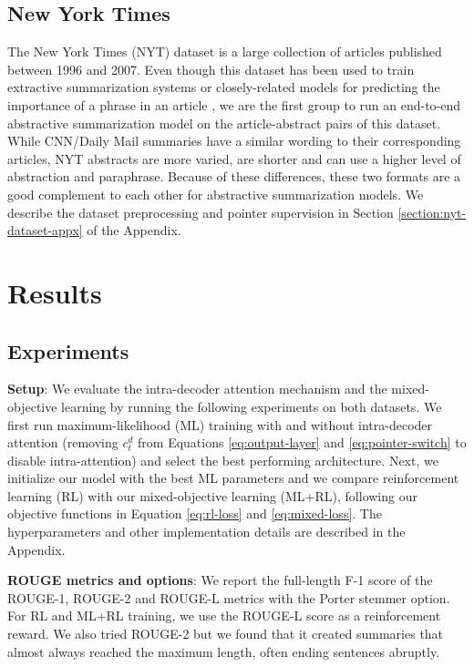 \subsection{New York Times}

The New York Times (NYT) dataset \citep{sandhaus2008} is a large collection of articles published between 1996 and 2007. Even though this dataset has been used to train extractive summarization systems \citep{durrett2016learning,hong2014,li2016} or closely-related models for predicting the importance of a phrase in an article \citep{yang2014,nye2015,hong2015}, we are the first group to run an end-to-end abstractive summarization model on the article-abstract pairs of this dataset. While CNN/Daily Mail summaries have a similar wording to their corresponding articles, NYT abstracts are more varied, are shorter and can use a higher level of abstraction and paraphrase. Because of these differences, these two formats are a good complement to each other for abstractive summarization models. We describe the dataset preprocessing and pointer supervision in Section \ref{section:nyt-dataset-appx} of the Appendix.

\section{Results}
\label{sec:results}

\subsection{Experiments}

{\bf Setup}: We evaluate the intra-decoder attention mechanism and the mixed-objective learning by running the following experiments on both datasets. We first run maximum-likelihood (ML) training with and without intra-decoder attention (removing $c^d_t$ from Equations \ref{eq:output-layer} and \ref{eq:pointer-switch} to disable intra-attention) and select the best performing architecture. Next, we initialize our model with the best ML parameters and we compare reinforcement learning (RL) with our mixed-objective learning (ML+RL), following our objective functions in Equation \ref{eq:rl-loss} and \ref{eq:mixed-loss}. The hyperparameters and other implementation details are described in the Appendix.

{\bf ROUGE metrics and options}: We report the full-length F-1 score of the ROUGE-1, ROUGE-2 and ROUGE-L metrics with the Porter stemmer option. For RL and ML+RL training, we use the ROUGE-L score as a reinforcement reward. We also tried ROUGE-2 but we found that it created summaries that almost always reached the maximum length, often ending sentences abruptly.

